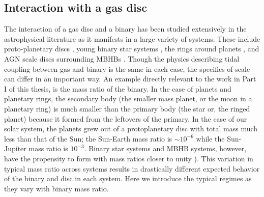 \subsection{Interaction with a gas disc}

The interaction of a gas disc and a binary has been studied extensively in the
astrophysical literature as it manifests in a large variety of systems. These
include proto-planetary discs \citep[\textit{e.g.}][]{Ward:1997}, young binary
star systems \citep[\textit{e.g.}][]{AL94}, the rings around planets
\citep{GTSaturn78}, and AGN scale discs surrounding MBHBs
\citep[\textit{e.g.}][]{GouldRix:2000}. Though the physics describing tidal
coupling between gas and binary is the same in each case, the specifics of
scale can differ in an important way.  An example directly relevant to the
work in Part I of this thesis, is the mass ratio of the binary. In the case of
planets and planetary rings, the secondary body (the smaller mass planet, or
the moon in a planetary ring) is much smaller than the primary body (the star
or, the ringed planet) because it formed from the leftovers of the primary. In
the case of our solar system, the planets grew out of a protoplanetary disc
with total mass much less than that of the Sun; the Sun-Earth mass
ratio is $\sim10^{-6}$ while the Sun-Jupiter mass ratio is $10^{-3}$. Binary
star systems and MBHB systems, however, have the propensity to form with mass
ratios closer to unity \citep[for MBHBs see previous section, for stars see][]{StellMassRatDist:2015}). This variation in typical mass ratio across
systems results in drastically different expected behavior of the binary and
disc in each system. Here we introduce the typical regimes as they vary with
binary mass ratio.

